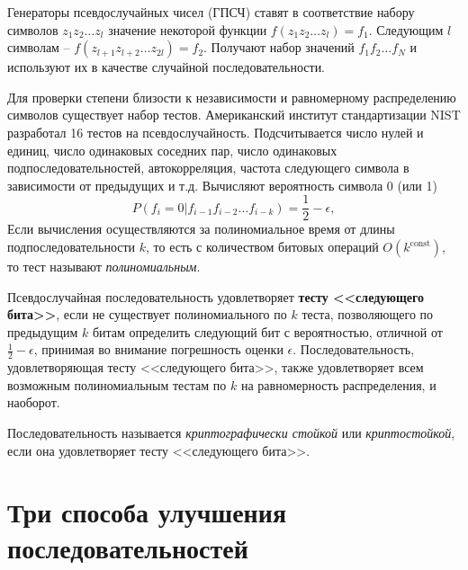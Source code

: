 \documentclass[10pt,a4paper]{book}
\begin{document}
Генераторы псевдослучайных чисел (ГПСЧ) ставят в соответствие набору символов $z_{1} z_{2} \dots z_{l}$ значение некоторой функции $f(z_{1} z_{2} \dots z_{l}) = f_{1}$. Следующим $l$ символам -- $f(z_{l+1} z_{l+2} \dots z_{2l}) = f_{2}$. Получают набор значений $f_{1} f_{2} \dots f_{N}$ и используют их в качестве случайной последовательности.

Для проверки степени близости к независимости и равномерному распределению символов существует набор тестов. Американский институт стандартизации NIST разработал 16 тестов на псевдослучайность. Подсчитывается число нулей и единиц, число одинаковых соседних пар, число одинаковых подпоследовательностей, автокорреляция, частота следующего символа в зависимости от предыдущих и т.д. Вычисляют вероятность символа 0 (или 1)
\[
    P(f_i = 0 | f_{i-1} f_{i-2} \dots f_{i-k}) = \frac{1}{2} - \epsilon,
\]
Если вычисления осуществляются за полиномиальное время от длины подпоследовательности $k$, то есть с количеством битовых операций $O(k^{\textrm{const}})$, то тест называют \emph{полиномиальным}.

Псевдослучайная последовательность удовлетворяет \textbf{тесту <<следующего бита>>}, если не существует полиномиального по $k$ теста, позволяющего по предыдущим $k$ битам определить следующий бит с вероятностью, отличной от $\frac{1}{2} - \epsilon$, принимая во внимание погрешность оценки $\epsilon$. Последовательность, удовлетворяющая тесту <<следующего бита>>, также удовлетворяет всем возможным полиномиальным тестам по $k$ на равномерность распределения, и наоборот.

Последовательность называется \emph{криптографически стойкой} или \emph{криптостойкой}, если она удовлетворяет тесту <<следующего бита>>.



%



\section[Три способа улучшения последовательностей]{Три способа улучшения \protect\\ последовательностей}






\end{document}
